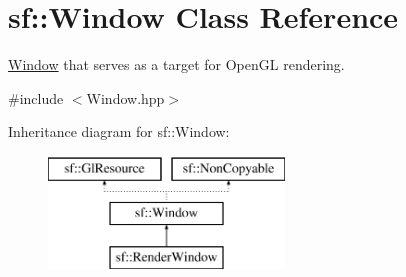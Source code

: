 \hypertarget{classsf_1_1Window}{\section{sf\-:\-:Window Class Reference}
\label{classsf_1_1Window}
}


\hyperlink{classsf_1_1Window}{Window} that serves as a target for Open\-G\-L rendering.  




{\ttfamily \#include $<$Window.\-hpp$>$}

Inheritance diagram for sf\-:\-:Window\-:\begin{figure}[H]
\begin{center}
\leavevmode
\includegraphics[height=3.000000cm]{classsf_1_1Window}
\end{center}
\end{figure}
